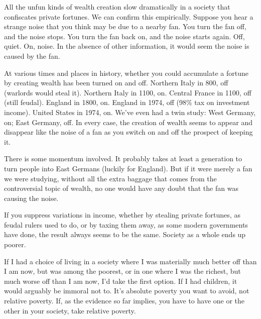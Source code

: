 All
                  the unfun kinds of wealth creation slow dramatically in a
                  society that confiscates private fortunes. We can confirm this
                  empirically. Suppose you hear a strange noise that you think
                  may be due to a nearby fan. You turn the fan off, and the
                  noise stops. You turn the fan back on, and the noise starts
                  again. Off, quiet. On, noise. In the absence of other
                  information, it would seem the noise is caused by the fan.

At
                  various times and places in history, whether you could
                  accumulate a fortune by creating wealth has been turned on and
                  off. Northern Italy in 800, off (warlords would steal it).
                  Northern Italy in 1100, on. Central France in 1100, off (still
                  feudal). England in 1800, on. England in 1974, off (98\% tax on
                  investment income). United States in 1974, on. We've even had
                  a twin study: West Germany, on; East Germany, off. In every
                  case, the creation of wealth seems to appear and disappear
                  like the noise of a fan as you switch on and off the prospect
                  of keeping it.

There is some momentum involved. It
                  probably takes at least a generation to turn people into East
                  Germans (luckily for England). But if it were merely a fan we
                  were studying, without all the extra baggage that comes from
                  the controversial topic of wealth, no one would have any doubt
                  that the fan was causing the noise.

If you suppress
                  variations in income, whether by stealing private fortunes, as
                  feudal rulers used to do, or by taxing them away, as some
                  modern governments have done, the result always seems to be
                  the same. Society as a whole ends up poorer.

If I
                  had a choice of living in a society where I was materially
                  much better off than I am now, but was among the poorest, or
                  in one where I was the richest, but much worse off than I am
                  now, I'd take the first option. If I had children, it would
                  arguably be immoral not to. It's absolute poverty you want to
                  avoid, not relative poverty. If, as the evidence so far
                  implies, you have to have one or the other in your society,
                  take relative poverty.

